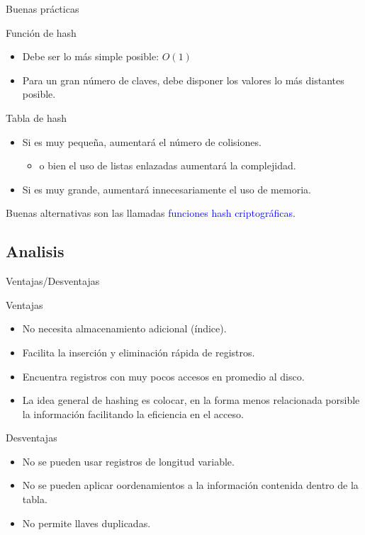 \documentclass[handout]{beamer} %
\newcommand{\blue}[1]{\textcolor{blue}{#1}}
\begin{document}
\begin{frame}{Buenas prácticas}
    \begin{block}{Función de hash}
    \begin{itemize}
        \item Debe ser lo más simple posible: $O(1)$
        \item Para un gran número de claves, debe disponer los valores lo más distantes posible.
    \end{itemize}
    \end{block}
    \pause
    \begin{block}{Tabla de hash}
    \begin{itemize}
        \item Si es muy pequeña, aumentará el número de colisiones.
        \begin{itemize}
            \item o bien el uso de listas enlazadas aumentará la complejidad.
        \end{itemize}
        \item Si es muy grande, aumentará innecesariamente el uso de memoria.
    \end{itemize}
    \end{block}
    \pause
    Buenas alternativas son las llamadas \blue{funciones hash criptográficas}.
\end{frame}

\subsection{Analisis} {Ventajas/Desventajas}
\begin{frame}{Ventajas}
\begin{itemize}
  \item No necesita almacenamiento adicional (índice).
  \item Facilita la inserción y eliminación rápida de registros.
  \item Encuentra  registros con muy pocos accesos en promedio al disco.
  \item La idea general de hashing es colocar, en la forma menos relacionada porsible la información facilitando la eficiencia en el acceso.
\end{itemize}
\end{frame}

\begin{frame}{Desventajas}
\begin{itemize}
  \item No se pueden usar registros de longitud variable.
  \item No se pueden aplicar oordenamientos a la información contenida dentro de la tabla.
  \item No permite llaves duplicadas.
\end{itemize}
\end{frame}
\end{document}
